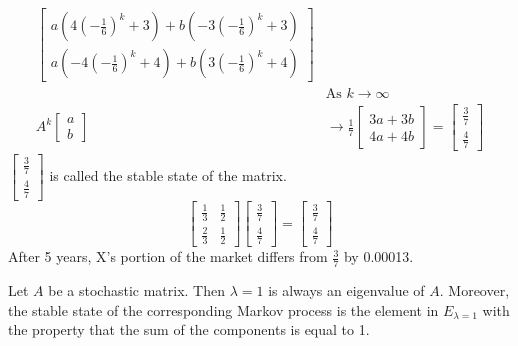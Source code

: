 \documentclass[12pt]{article}
\begin{document}
\begin{example}
$$\begin{aligned}
\begin{bmatrix}
a(4(-\frac{1}{6})^k + 3) + b(-3(-\frac{1}{6})^k + 3) \\ a(-4(-\frac{1}{6})^k + 4) + b(3(-\frac{1}{6})^k + 4) \end{bmatrix} \\ &\text{As } k \to \infty \\ A^k\begin{bmatrix} a \\ b \end{bmatrix} &\to \frac{1}{7}\begin{bmatrix} 3a + 3b \\ 4a + 4b \end{bmatrix} = \begin{bmatrix} \frac{3}{7} \\ \frac{4}{7} \end{bmatrix} \end{aligned} $$ 
$\begin{bmatrix} \frac{3}{7} \\ \frac{4}{7} \end{bmatrix}$ is called the stable state of the matrix. $$ \begin{bmatrix} \frac{1}{3} & \frac{1}{2} \\ \frac{2}{3} & \frac{1}{2} \end{bmatrix}\begin{bmatrix} \frac{3}{7} \\ \frac{4}{7} \end{bmatrix} = \begin{bmatrix} \frac{3}{7} \\ \frac{4}{7} \end{bmatrix} $$ After 5 years, X's portion of the market differs from $\frac{3}{7}$ by 0.00013. \end{example} 
\begin{theorem} Let $A$ be a stochastic matrix. Then $\lambda = 1$ is always an eigenvalue of $A$. Moreover, the stable state of the corresponding Markov process is the element in $E_{\lambda = 1}$ with the property that the sum of the components is equal to 1. \end{theorem} 
\end{document}
